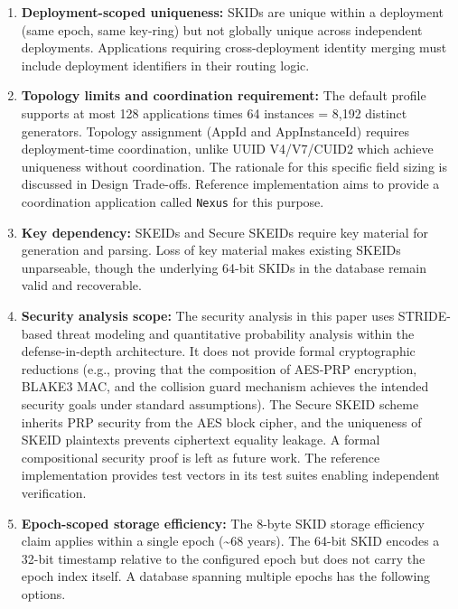 \documentclass[fleqn,10pt,lineno]{wlpeerj}
\begin{document}
\begin{enumerate}
\def\labelenumi{\arabic{enumi}.}
\item
  \textbf{Deployment-scoped uniqueness:} SKIDs are unique within a
  deployment (same epoch, same key-ring) but not globally unique across
  independent deployments. Applications requiring cross-deployment
  identity merging must include deployment identifiers in their routing
  logic.
\item
  \textbf{Topology limits and coordination requirement:} The default
  profile supports at most 128 applications times 64 instances = 8,192
  distinct generators. Topology assignment (AppId and AppInstanceId)
  requires deployment-time coordination, unlike UUID V4/V7/CUID2 which
  achieve uniqueness without coordination. The rationale for this
  specific field sizing is discussed in Design Trade-offs. Reference
  implementation aims to provide a coordination application called
  \texttt{Nexus} for this purpose.
\item
  \textbf{Key dependency:} SKEIDs and Secure SKEIDs require key material
  for generation and parsing. Loss of key material makes existing SKEIDs
  unparseable, though the underlying 64-bit SKIDs in the database remain
  valid and recoverable.
\item
  \textbf{Security analysis scope:} The security analysis in this paper
  uses STRIDE-based threat modeling and quantitative probability
  analysis within the defense-in-depth architecture. It does not provide
  formal cryptographic reductions (e.g., proving that the composition of
  AES-PRP encryption, BLAKE3 MAC, and the collision guard mechanism
  achieves the intended security goals under standard assumptions). The
  Secure SKEID scheme inherits PRP security from the AES block cipher,
  and the uniqueness of SKEID plaintexts prevents ciphertext equality
  leakage. A formal compositional security proof is left as future work.
  The reference implementation provides test vectors in its test suites
  enabling independent verification.
\item
  \textbf{Epoch-scoped storage efficiency:} The 8-byte SKID storage
  efficiency claim applies within a single epoch (\textasciitilde68
  years). The 64-bit SKID encodes a 32-bit timestamp relative to the
  configured epoch but does not carry the epoch index itself. A database
  spanning multiple epochs has the following options.


\end{enumerate}
\end{document}
